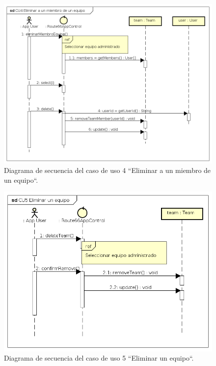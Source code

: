 \documentclass[twoside]{report}
\begin{document}
\begin{figure}[H]
\begin{center}
\includegraphics[scale=0.55]{images/sequence/CU4}
\caption{Diagrama de secuencia del caso de uso 4 “Eliminar a un miembro de un equipo“.}
\end{center}
\end{figure}

\begin{figure}[H]
\begin{center}
\includegraphics[scale=0.55]{images/sequence/CU5}
\caption{Diagrama de secuencia del caso de uso 5 “Eliminar un equipo“.}
\end{center}
\end{figure}
\end{document}
